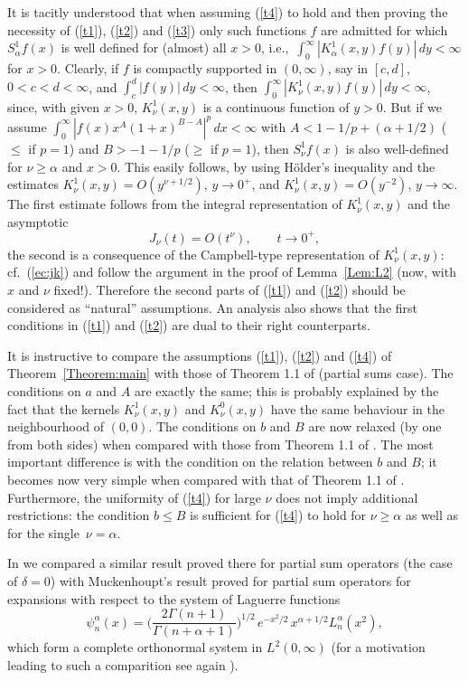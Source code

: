 \documentclass[leqno,a4paper]{amsart}
\begin{document}
It is tacitly understood that when assuming (\ref{t4}) to hold and then proving the
necessity of (\ref{t1}), (\ref{t2}) and (\ref{t3}) only such functions
$f$ are admitted for which $S^1_\alpha f(x)$ is well defined for (almost) all
$x>0$, i.e.,\ $\int_0^\infty|K^1_\alpha(x,y)f(y)|\,dy < \infty$ for $x>0$.
Clearly, if $f$ is compactly supported in $(0,\infty)$, say in $[c,d]$, $0<c<d<\infty$,
and $\int_c^d|f(y)|\,dy < \infty$, then $\int_0^\infty|K^1_\nu(x,y)f(y)|\,dy<\infty$,
since, with given $x>0$, $K^1_\nu(x,y)$ is a continuous function of $y>0$.
But if we assume $\int_0^\infty|f(x)x^A(1+x)^{B-A}|^p\,dx < \infty$
with $A<1-1/p+(\alpha+1/2)$ ($\le$ if $p=1$) and $B>-1-1/p$ ($\ge$ if $p=1$),
then $S_\nu^1 f(x)$ is also well-defined for $\nu\ge\alpha$ and $x>0$.
This easily follows, by using H\"older's inequality and the estimates
$K_\nu^1(x,y) = O(y^{\nu+1/2})$, $y\to0^+$, and $K_\nu^1(x,y)=O(y^{-2})$,
$y\to\infty$. The first estimate follows from the integral representation of
$K_\nu^1(x,y)$ and the asymptotic
\begin{equation}
J_\nu(t) = O(t^{\nu}), \qquad t\to0^+,
\label{asy}
\end{equation}
the second is a consequence of the Campbell-type representation
of $K_\nu^1(x,y)$:
cf.~(\ref{ec:jk}) and follow the argument in the proof of Lemma~\ref{Lem:L2}
(now, with $x$ and $\nu$ fixed!).
Therefore the second parts of (\ref{t1}) and (\ref{t2}) should be considered
as ``natural'' assumptions. An analysis also shows that the first conditions
in (\ref{t1}) and (\ref{t2}) are dual to their right counterparts.

It is instructive to compare the assumptions (\ref{t1}), (\ref{t2})
and (\ref{t4}) of Theorem~\ref{Theorem:main} with those of Theorem 1.1 of
\cite{St} (partial sums case). The conditions on $a$ and $A$ are exactly the
same; this is probably explained by the fact that the kernels $K^1_\nu(x,y)$
and $K^0_\nu(x,y)$ have the same behaviour in the neighbourhood of $(0,0)$.
The conditions on $b$ and $B$ are now relaxed (by one from both sides) when
compared with those from Theorem 1.1 of \cite{St}. The most important difference
is with the condition on the relation between $b$ and $B$; it becomes now
very simple when compared with that of Theorem 1.1 of \cite{St}. Furthermore,
the uniformity of (\ref{t4}) for large $\nu$ does not imply additional restrictions:
the condition $b\le B$ is sufficient for (\ref{t4}) to hold for $\nu\ge\alpha$
as well as for the single~$\nu=\alpha$.

In \cite{St} we compared a similar result proved there for partial sum operators
(the case of $\delta=0$) with Muckenhoupt's result \cite{Mu} proved for partial
sum operators for expansions with respect to the system of
Laguerre functions
$$
\psi_n^\alpha(x)=\bigg(\frac{2\Gamma(n+1)}
{\Gamma(n+\alpha+1)}\bigg)^{1/2}\,e^{-x^2/2}\,x^{\alpha+1/2}L_n^\alpha(x^2),
$$
which form a complete orthonormal system in $L^2(0,\infty)$ (for a motivation
leading to such a comparition see again \cite{St}).
\end{document}
